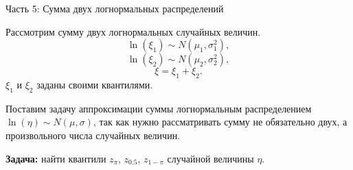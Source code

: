 \documentclass[ucs, notheorems, handout]{beamer}
\begin{document}
	
	\begin{frame}{Часть 5: Сумма двух логнормальных распределений }
		
		Рассмотрим сумму двух логнормальных случайных величин.
		\begin{equation*}
			\ln(\xi_{1}) \sim N(\mu_{1}, \sigma _{1}^{2}),
		\end{equation*}
		\begin{equation*}
			\ln(\xi_{2}) \sim N(\mu_{2}, \sigma _{2}^{2}),
		\end{equation*}
		\begin{equation*}
			\xi = \xi_{1}+\xi_{2}.
		\end{equation*}
		$\xi_{1}$ и $\xi_{2}$ заданы своими квантилями.
		\bigskip
		
		Поставим задачу аппроксимации суммы логнормальным распределением $\ln(\eta)\sim N(\mu, \sigma)$, так как нужно рассматривать сумму не обязательно двух, а произвольного числа случайных величин. 
		
		\bigskip
		
		\textbf{Задача:} найти квантили $z_{\pi}$, $z_{0.5}$, $z_{1-\pi}$ случайной величины $\eta$.
		
		
		
	\end{frame}
	
\end{document}

